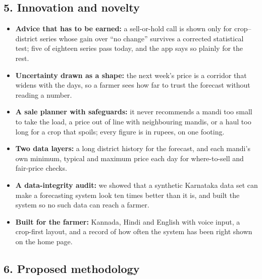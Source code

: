 \documentclass[11pt,a4paper]{article}
\begin{document}
\subsection*{5. Innovation and novelty}
\begin{itemize}[leftmargin=*,nosep]
\item \textbf{Advice that has to be earned:} a sell-or-hold call is shown only for crop--district series whose gain over ``no change'' survives a corrected statistical test; five of eighteen series pass today, and the app says so plainly for the rest.
\item \textbf{Uncertainty drawn as a shape:} the next week's price is a corridor that widens with the days, so a farmer sees how far to trust the forecast without reading a number.
\item \textbf{A sale planner with safeguards:} it never recommends a mandi too small to take the load, a price out of line with neighbouring mandis, or a haul too long for a crop that spoils; every figure is in rupees, on one footing.
\item \textbf{Two data layers:} a long district history for the forecast, and each mandi's own minimum, typical and maximum price each day for where-to-sell and fair-price checks.
\item \textbf{A data-integrity audit:} we showed that a synthetic Karnataka data set can make a forecasting system look ten times better than it is, and built the system so no such data can reach a farmer.
\item \textbf{Built for the farmer:} Kannada, Hindi and English with voice input, a crop-first layout, and a record of how often the system has been right shown on the home page.
\end{itemize}

\subsection*{6. Proposed methodology}
\end{document}
